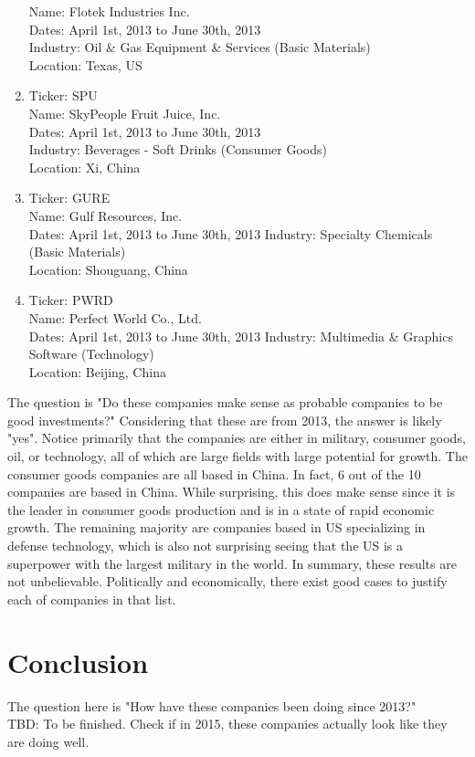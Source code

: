 \documentclass[preprint,12pt]{elsarticle}
\begin{document}
\begin{enumerate}
    	Name: Flotek Industries Inc. \\
        Dates: April 1st, 2013 to June 30th, 2013 \\ 
        Industry: Oil \& Gas Equipment \& Services (Basic Materials)\\
        Location: Texas, US
    \item Ticker: SPU \\
    	Name: SkyPeople Fruit Juice, Inc. \\
        Dates: April 1st, 2013 to June 30th, 2013 \\
        Industry: Beverages - Soft Drinks (Consumer Goods) \\ 
        Location: Xi, China
    \item Ticker: GURE \\ 
    	Name: Gulf Resources, Inc. \\
        Dates: April 1st, 2013 to June 30th, 2013
        Industry: Specialty Chemicals (Basic Materials) \\ 
        Location: Shouguang, China
    \item Ticker: PWRD \\ 
    	Name: Perfect World Co., Ltd. \\
        Dates: April 1st, 2013 to June 30th, 2013
        Industry: Multimedia \& Graphics Software (Technology) \\ 
        Location: Beijing, China
\end{enumerate}

The question is "Do these companies make sense as probable companies to be good investments?" Considering that these are from 2013, the answer is likely "yes". Notice primarily that the companies are either in military, consumer goods, oil, or technology, all of which are large fields with large potential for growth. The consumer goods companies are all based in China. In fact, 6 out of the 10 companies are based in China. While surprising, this does make sense since it is the leader in consumer goods production and is in a state of rapid economic growth. The remaining majority are companies based in US specializing in defense technology, which is also not surprising seeing that the US is a superpower with the largest military in the world. In summary, these results are not unbelievable. Politically and economically, there exist good cases to justify each of companies in that list. 

\section{Conclusion}
\label{S:5}
The question here is "How have these companies been doing since 2013?" \\
TBD: To be finished. Check if in 2015, these companies actually look like they are doing well.
\end{document}
